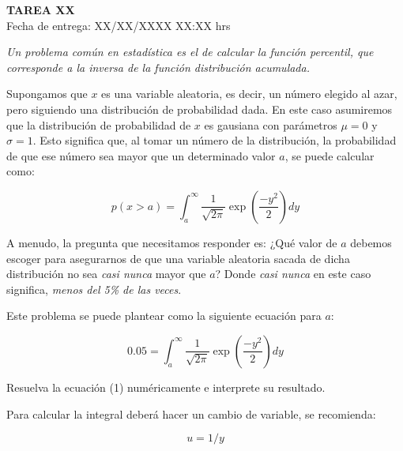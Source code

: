 \documentclass[letter, 11pt]{article}
\newcommand{\tareanro}{XX}
\newcommand{\fechaentrega}{XX/XX/XXXX XX:XX hrs}
\begin{document}
\thispagestyle{firstpage}

\begin{center}
  {\uppercase{\LARGE \bf Tarea \tareanro}}\\
  Fecha de entrega: \fechaentrega
\end{center}



{\it Un problema común en estadística es el de calcular la función percentil,
que corresponde a la inversa de la función distribución acumulada.}

Supongamos que $x$ es una variable aleatoria, es decir, un número elegido al
azar, pero siguiendo una distribución de probabilidad dada. En este caso
asumiremos que la distribución de probabilidad de $x$ es gausiana con
parámetros $\mu=0$ y $\sigma=1$. Esto significa que, al tomar un número de la
distribución, la probabilidad de que ese número sea mayor que un determinado
valor $a$, se puede calcular como:

$$ p(x>a) = \int_{a}^{\infty} \frac{1}{\sqrt{2\pi}} \exp\left({\frac{-y^2}{2}}\right) dy $$

A menudo, la pregunta que necesitamos responder es: ¿Qué valor de $a$ debemos
escoger para asegurarnos de que una variable aleatoria sacada de dicha
distribución no sea {\it casi nunca} mayor que $a$? Donde {\it casi nunca} en
este caso significa, {\it menos del 5\% de las veces}.

Este problema se puede plantear como la siguiente ecuación para $a$:

\begin{equation}
0.05 = \int_{a}^{\infty} \frac{1}{\sqrt{2\pi}} \exp\left({\frac{-y^2}{2}}\right) dy
\end{equation}

Resuelva la ecuación (1) numéricamente e interprete su resultado.

\begin{ayuda}
  Para calcular la integral deberá hacer un cambio de variable, se recomienda:

  $$ u = 1/y$$
\end{ayuda}

\end{document}
